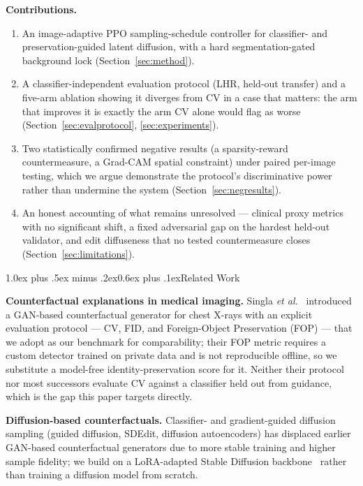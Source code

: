 \documentclass[10pt,twocolumn]{article}
\makeatletter
\renewcommand\section{\@startsection{section}{1}{\z@}%
  {1.0ex plus .5ex minus .2ex}{0.6ex plus .1ex}{\normalfont\large\bfseries}}
\makeatother
\begin{document}
\textbf{Contributions.}
\begin{enumerate}[leftmargin=*,itemsep=1pt,topsep=2pt]
  \item An image-adaptive PPO sampling-schedule controller for
        classifier- and preservation-guided latent diffusion, with a hard
        segmentation-gated background lock (Section~\ref{sec:method}).
  \item A classifier-independent evaluation protocol (LHR, held-out
        transfer) and a five-arm ablation showing it diverges from CV in
        a case that matters: the arm that improves it is exactly the arm
        CV alone would flag as worse (Section~\ref{sec:evalprotocol},
        \ref{sec:experiments}).
  \item Two statistically confirmed negative results (a sparsity-reward
        countermeasure, a Grad-CAM spatial constraint) under paired
        per-image testing, which we argue demonstrate the protocol's
        discriminative power rather than undermine the system
        (Section~\ref{sec:negresults}).
  \item An honest accounting of what remains unresolved — clinical proxy
        metrics with no significant shift, a fixed adversarial gap on the
        hardest held-out validator, and edit diffuseness that no tested
        countermeasure closes (Section~\ref{sec:limitations}).
\end{enumerate}

\section{Related Work}

\textbf{Counterfactual explanations in medical imaging.} Singla \emph{et
al.}~\cite{singla2022} introduced a GAN-based counterfactual generator
for chest X-rays with an explicit evaluation protocol — CV, FID, and
Foreign-Object Preservation (FOP) — that we adopt as our benchmark for
comparability; their FOP metric requires a custom detector trained on
private data and is not reproducible offline, so we substitute a
model-free identity-preservation score for it. Neither their protocol
nor most successors evaluate CV against a classifier held out from
guidance, which is the gap this paper targets directly.

\textbf{Diffusion-based counterfactuals.} Classifier- and gradient-guided
diffusion sampling (guided diffusion, SDEdit, diffusion autoencoders) has
displaced earlier GAN-based counterfactual generators due to more stable
training and higher sample fidelity; we build on a LoRA-adapted Stable
Diffusion backbone~\cite{rombach2022,hu2021lora} rather than training a
diffusion model from scratch.
\end{document}

